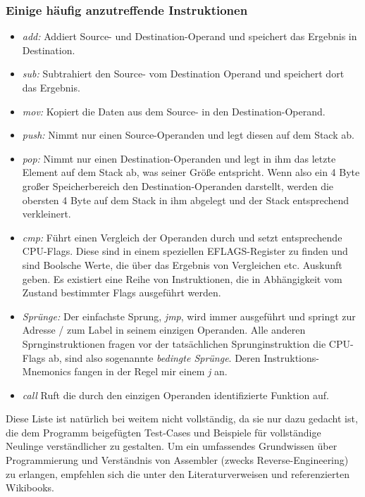 \documentclass[11pt]{article} %
\begin{document}
\subsubsection{Einige häufig anzutreffende Instruktionen}
\begin{itemize}
	\item{\textit{add:}} Addiert Source- und Destination-Operand und speichert das Ergebnis in
		Destination.
	\item{\textit{sub:}} Subtrahiert den Source- vom Destination Operand und speichert dort das
		Ergebnis.
	\item{\textit{mov:}} Kopiert die Daten aus dem Source- in den Destination-Operand.
	\item{\textit{push:}} Nimmt nur einen Source-Operanden und legt diesen auf dem Stack ab.
	\item{\textit{pop:}} Nimmt nur einen Destination-Operanden und legt in ihm das letzte
		Element auf dem Stack ab, was seiner Größe entspricht. Wenn also ein 4 Byte großer
		Speicherbereich den Destination-Operanden darstellt, werden die obersten 4 Byte auf
		dem Stack in ihm abgelegt und der Stack entsprechend verkleinert.
	\item{\textit{cmp:}} Führt einen Vergleich der Operanden durch und setzt entsprechende
		CPU-Flags. Diese sind in einem speziellen EFLAGS-Register zu finden und sind
		Boolsche Werte, die über das Ergebnis von Vergleichen etc. Auskunft geben. Es
		existiert eine Reihe von Instruktionen, die in Abhängigkeit vom Zustand bestimmter
		Flags ausgeführt werden.
	\item{\textit{Sprünge:}} Der einfachste Sprung, \textit{jmp}, wird immer ausgeführt und
		springt zur Adresse / zum Label in seinem einzigen Operanden. Alle anderen
		Sprnginstruktionen fragen vor der tatsächlichen Sprunginstruktion die CPU-Flags ab,
		sind also sogenannte \textit{bedingte Sprünge}. Deren Instruktions-Mnemonics fangen
		in der Regel mir einem \textit{j} an.
	\item{\textit{call}} Ruft die durch den einzigen Operanden identifizierte Funktion auf.
\end{itemize}
Diese Liste ist natürlich bei weitem nicht vollständig, da sie nur dazu gedacht ist, die dem
Programm beigefügten Test-Cases und Beispiele für vollständige Neulinge verständlicher zu gestalten.
Um ein umfassendes Grundwissen über Programmierung und Verständnis von Assembler (zwecks
Reverse-Engineering) zu erlangen, empfehlen sich die unter den Literaturverweisen \cite{wikibook1:7}
und \cite{wikibook2:8} referenzierten Wikibooks.
\end{document}
